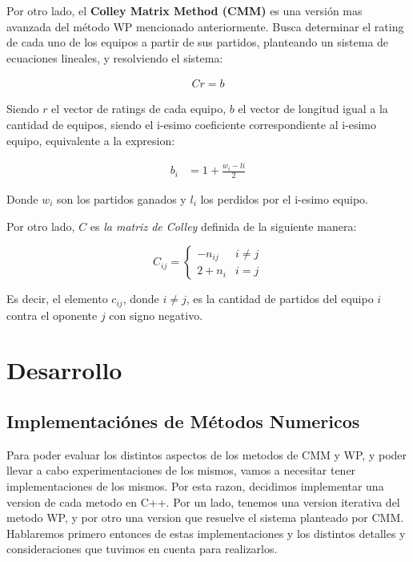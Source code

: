 \documentclass[a4paper]{article}
\begin{document}
Por otro lado, el \textbf{Colley Matrix Method (CMM)} es una versión mas avanzada del método WP mencionado anteriormente. Busca determinar el rating de cada uno de los equipos a partir de sus partidos, planteando un sistema de ecuaciones lineales, y resolviendo el sistema:

\begin{align*}
Cr = b
\end{align*}

Siendo $r$ el vector de ratings de cada equipo, $b$ el vector de longitud igual a la cantidad de equipos, siendo el i-esimo coeficiente correspondiente al i-esimo equipo, equivalente a la expresion:

\begin{align*}
b_{i} &= 1 + \frac{w_{i}-l{i}}{2}
\end{align*}

Donde $w_{i}$ son los partidos ganados y $l_{i}$ los perdidos por el i-esimo equipo.

Por otro lado, $C$ es \textit{la matriz de Colley} definida de la siguiente manera:

\[ C_{ij}=
    \begin{cases} 
      -n_{ij} & i\neq j \\
      2+n_{i} & i=j
   \end{cases}
\]

Es decir, el elemento $c_{ij}$, donde $i \neq j$, es la cantidad de partidos del equipo $i$ contra el oponente $j$ con signo negativo.

\section{Desarrollo}

\subsection{Implementaciónes de Métodos Numericos}

Para poder evaluar los distintos aspectos de los metodos de CMM y WP, y poder llevar a cabo experimentaciones de los mismos, vamos a necesitar tener implementaciones de los mismos. Por esta razon, decidimos implementar una version de cada metodo en C++. Por un lado, tenemos una version iterativa del metodo WP, y por otro una  version que resuelve el sistema planteado por CMM. Hablaremos primero entonces de estas implementaciones y los distintos detalles y consideraciones que tuvimos en cuenta para realizarlos.
\end{document}
